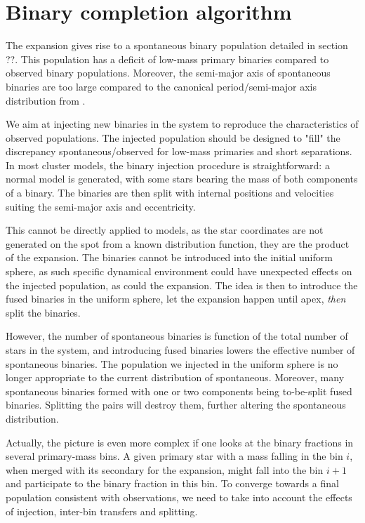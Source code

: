 \chapter{Binary completion algorithm}

The \HubLem expansion gives rise to a spontaneous binary population detailed in section ??. This population has a deficit of low-mass primary binaries compared to observed binary populations. Moreover, the semi-major axis of spontaneous binaries are too large compared to the canonical period/semi-major axis distribution from \cite{Raghavan2010}.

We aim at injecting new binaries in the system to reproduce the characteristics of observed populations. The injected population should be designed to "fill" the discrepancy spontaneous/observed for low-mass primaries and short separations. In most cluster models, the binary injection procedure is straightforward: a normal model is generated, with some stars bearing the mass of both components of a binary. The binaries are then split with internal positions and velocities suiting the semi-major axis and eccentricity. 

This cannot be directly applied to \HubLem models, as the star coordinates are not generated on the spot from a known distribution function, they are the product of the expansion. The binaries cannot be introduced into the initial uniform sphere, as such specific dynamical environment could have unexpected effects on the injected population, as could the expansion. The idea is then to introduce the fused binaries in the uniform sphere, let the expansion happen until apex, \textit{then} split the binaries.

However, the number of spontaneous binaries is function of the total number of stars in the system, and introducing fused binaries lowers the effective number of spontaneous binaries. The population we injected in the uniform sphere is no longer appropriate to the current distribution of spontaneous. Moreover, many spontaneous binaries formed with one or two components being to-be-split fused binaries. Splitting the pairs will destroy them, further altering the spontaneous distribution.

Actually, the picture is even more complex if one looks at the binary fractions in several primary-mass bins. A given primary star with a mass falling in the bin $i$, when merged with its secondary for the expansion, might fall into the bin $i+1$ and participate to the binary fraction in this bin. To converge towards a final population consistent with observations, we need to take into account the effects of injection, inter-bin transfers and splitting.

